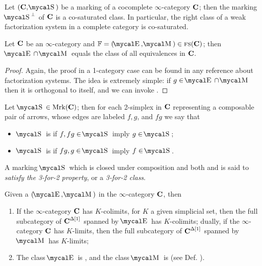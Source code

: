 \begin{proposition}
Let $(\CC,\mS)$ be a marking of a cocomplete $\infty$\hyp{}category $\textbf{C}$; then the marking $\mS^\perp$ of $\textbf{C}$ is a co\hyp{}saturated class. In particular, the right class of a weak factorization system in a complete category is co\hyp{}saturated.
\end{proposition}
\begin{proposition}\label{thereiso}
Let $\textbf{C}$ be an $\infty$\hyp{}category and $\fF =(\EE,\MM)\in \fs(\CC)$; then $\EE\cap \MM$ equals the class of all equivalences in $\textbf{C}$.
\end{proposition}
\begin{proof}
Again, the proof in a 1\hyp{}category case can be found in any reference about factorization systems. The idea is extremely simple: if $g\in\EE\cap \MM$ then it is orthogonal to itself, and we can invoke .
\end{proof}
\begin{definition}\label{def:3for2}
Let $\mS\in\mrk(\CC)$; then for each 2\hyp{}simplex in $\textbf{C}$ representing a composable pair of arrows, whose edges are labeled $f,g$, and  $f g$  we say that
\begin{itemize}
\item $\mS$ is  if $f, fg\in \mS$ imply $g\in\mS$;
\item $\mS$ is  if $fg, g\in \mS$ imply $f\in\mS$.
\end{itemize}
A marking $\mS$ which is closed under composition and both  and  is said to \emph{satisfy the 3\hyp{}for\hyp{}2 property}, or a \emph{3\hyp{}for\hyp{}2 class}.
\end{definition}
\begin{proposition}
\label{prop:clos}
Given a  $(\mcal{E},\mcal{M})$ in the $\infty$\hyp{}category $\textbf{C}$, then
\begin{enumerate}
\item {}If the $\infty$\hyp{}category $\textbf{C}$ has $K$\hyp{}colimits, for $K$ a given simplicial set, then the full subcategory of $\textbf{C}^{\Delta[1]}$ spanned by $\mcal{E}$ has $K$\hyp{}colimits; dually, if  the $\infty$\hyp{}category $\textbf{C}$ has $K$\hyp{}limits, then the full subcategory of $\textbf{C}^{\Delta[1]}$ spanned by $\mcal{M}$ has $K$\hyp{}limits;
\item The class $\mcal{E}$ is , and the class $\mcal{M}$ is  (see Def. ).
\end{enumerate} 
\end{proposition}
